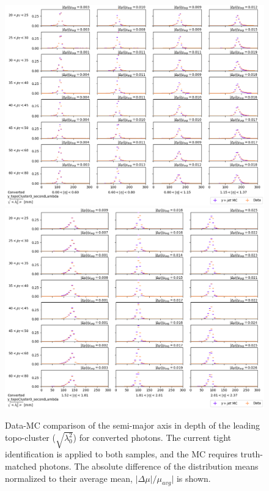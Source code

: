 \begin{figure}[!thp]
    \centering
    \includegraphics[width=.74\textwidth]{appendices/datamc_images/y_topoCluster0_secondLambda_Converted_lowerEta.png}
    \includegraphics[width=.74\textwidth]{appendices/datamc_images/y_topoCluster0_secondLambda_Converted_upperEta.png}
    \caption[Data-MC comparison of the semi-major axis in depth of the leading topo-cluster ($\sqrt{\lambda_0^2}$) for converted photons]{Data-MC comparison of the semi-major axis in depth of the leading topo-cluster ($\sqrt{\lambda_0^2}$) for converted photons. The current tight identification is applied to both samples, and the \gls{MC} requires truth-matched photons. The absolute difference of the distribution means normalized to their average mean, $|\Delta \mu|/\mu_{avg}|$ is shown.}
    \label{fig:dmc-c-sl}
\end{figure}
